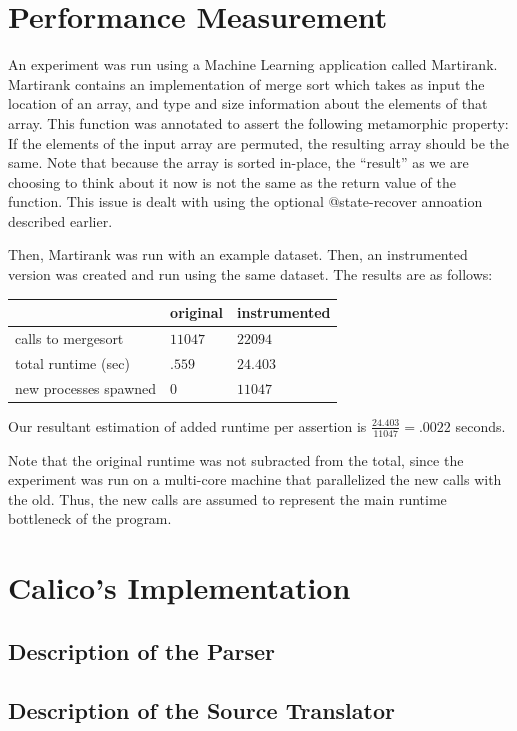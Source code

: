 \documentclass[notitlepage]{article}
\begin{document}
\section{Performance Measurement}

An experiment was run using a Machine Learning application called Martirank. Martirank contains an implementation of merge sort which takes as input the location of an array, and type and size information about the elements of that array. This function was annotated to assert the following metamorphic property: If the elements of the input array are permuted, the resulting array should be the same. Note that because the array is sorted in-place, the ``result'' as we are choosing to think about it now is not the same as the return value of the function. This issue is dealt with using the optional \ttfamily @state-recover \rmfamily annoation described earlier.

Then, Martirank was run with an example dataset. Then, an instrumented version was created and run using the same dataset. The results are as follows:

\begin{tabular}{l | l | l}
& original & instrumented \\ \hline
calls to mergesort & $11047$ & $22094$ \\
total runtime (sec) & $.559$ & $24.403$\\
new processes spawned & 0 & $11047$
\end{tabular}

Our resultant estimation of added runtime per assertion is $\frac{24.403}{11047} = {\mathbf .0022}$ seconds.

Note that the original runtime was not subracted from the total, since the experiment was run on a multi-core machine that parallelized the new calls with the old. Thus, the new calls are assumed to represent the main runtime bottleneck of the program.

\section{Calico's Implementation}

\subsection{Description of the Parser}

\subsection{Description of the Source Translator}
\end{document}
